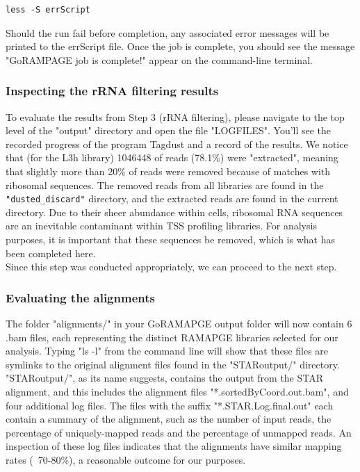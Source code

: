 \documentclass[runningheads,a4paper]{llncs}
\begin{document}
\begin{linenumbers}
\noindent
\begin{verbatim}
less -S errScript
\end{verbatim}

Should the run fail before completion, any associated error messages will be printed to the errScript file. Once the job is complete, you should see the message "GoRAMPAGE job is complete!" appear on the command-line terminal.

\subsubsection{Inspecting the rRNA filtering results}

To evaluate the results from Step 3 (rRNA filtering), please navigate to the top level of the "output" directory and open the file "LOGFILES".
You'll see the recorded progress of the program Tagdust and a record of the results.
We notice that (for the L3h library) 1046448 of reads (78.1\%) were "extracted", meaning that slightly more than 20\% of reads were removed because of matches with ribosomal sequences.
The removed reads from all libraries are found in the \texttt{"dusted\_discard"} directory, and the extracted reads are found in the current directory. 
Due to their sheer abundance within cells, ribosomal RNA sequences are an inevitable contaminant within TSS profiling libraries. 
For analysis purposes, it is important that these sequences be removed, which is what has been completed here.\\
Since this step was conducted appropriately, we can proceed to the next step.

\subsubsection{Evaluating the alignments}

The folder "alignments/" in your GoRAMAPGE output folder will now contain 6 .bam files, each representing the distinct RAMAPGE libraries selected for our analysis.
Typing "ls -l" from the command line will show that these files are symlinks to the original alignment files found in the "STARoutput/" directory.
"STARoutput/", as its name suggests, contains the output from the STAR alignment, and this includes the alignment files "*.sortedByCoord.out.bam", and four additional log files.
The files with the suffix "*.STAR.Log.final.out" each contain a summary of the alignment, such as the number of input reads, the percentage of uniquely-mapped reads and the percentage of unmapped reads.
An inspection of these log files indicates that the alignments have similar mapping rates (~70-80\%), a reasonable outcome for our purposes.\\


\end{linenumbers}
\end{document}
